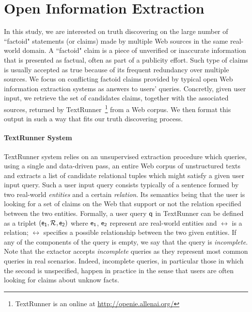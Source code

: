 \section{Open Information Extraction}

In this study, we are interested on truth discovering on the large number of ``factoid" statements
(or claims) made by multiple Web sources in the same real-world domain. A ``factoid" claim is
a piece of unverified or inaccurate information that is presented as factual, often
as part of a publicity effort. Such type of claims  is usually accepted as true  because of its
frequent redundancy over multiple sources. We focus on conflicting factoid claims provided by typical 
open Web information extraction systems as answers to users' queries. Concretly, given user input, 
we retrieve the set of candidates claims, together with the associated sources, returned by TextRunner~\footnote{TextRunner is an online
at \href{http://openie.allenai.org/}{http://openie.allenai.org/}}
from a Web corpus. We then format this output in such a way that fits our truth discovering process.



\paragraph*{TextRunner System}
TextRunner system relies on an unsupervised extraction procedure which queries, using a single and data-driven 
pass, an entire Web corpus of unstructured texts and extracts a list of candidate relational tuples which might
satisfy a given user input query. Such a user input query consists typically of a sentence formed by two real-world
\emph{entities} and a certain \emph{relation}. Its semantics being that the user is looking for a set of 
claims on the Web that support or not the relation specified between the two entities. Formally, a user query
$\mathsf{q}$ in TextRunner can be defined as a triplet $(\mathsf{e_{1}}, \mathcal{R}_{}, \mathsf{e_{2}})$ where $\mathsf{e_{1}}$, $\mathsf{e_{2}}$ represent
are real-world entities and $\rel{}$ is a relation; $\rel{}$ specifies a possible relationship between the
two given entities. If any of the components of the query is empty, we say that the query is \emph{incomplete}.
Note that the extactor accepts \emph{incomplete} queries as they represent most common queries in real scenarios.
Indeed, incomplete queries, in particular those in which the second is unspecified, happen in practice in the sense 
that users are often looking for claims about unknow facts.

